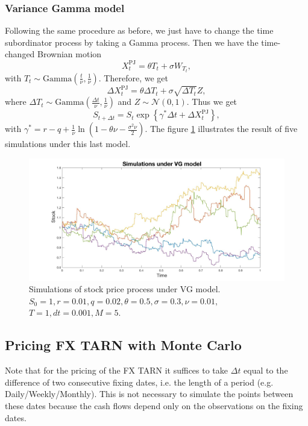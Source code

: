\subsubsection{Variance Gamma model}
Following the same procedure as before, we just have to change the time subordinator process by taking a Gamma process. Then we have the time-changed Brownian motion
$$X_t^\text{PJ}=\theta T_t + \sigma W_{T_t},$$
with $T_t\sim \text{Gamma}\left(\frac{t}{\nu},\frac{1}{\nu} \right)$. Therefore, we get
$$\Delta X_t^\text{PJ} = \theta \Delta T_t + \sigma \sqrt{\Delta T_t} Z,$$
where $\Delta T_t\sim\text{Gamma}\left(\frac{\Delta t}{\nu},\frac{1}{\nu}\right)$ and $Z\sim\mathcal{N}(0,1)$.
Thus we get
$$S_{t+\Delta t} = S_t \exp\left\{\gamma^\ast\Delta t + \Delta X_t^\text{PJ}\right\},$$
with $\gamma^\ast = r-q + \frac{1}{\nu}\ln\left(1-\theta\nu-\frac{\sigma^2\nu}{2}\right)$.
The figure \ref{fig:MC:VG} illustrates the result of five simulations under this last model.
\begin{figure}[!htb]
	\includegraphics[width=\textwidth]{gfx/VG_plot}
	\caption{Simulations of stock price process under VG model.\\ $S_0=1, r= 0.01,q = 0.02,\theta = 0.5 , \sigma = 0.3, \nu = 0.01,$\\$T = 1, dt = 0.001, M=5$.}
	\label{fig:MC:VG}
\end{figure}

\subsection{Pricing FX TARN with Monte Carlo}
Note that for the pricing of the FX TARN it suffices to take $\Delta t$ equal to the difference of two consecutive fixing dates, i.e. the length of a period (e.g. Daily/Weekly/Monthly). This is not necessary to simulate the points between these dates because the cash flows depend only on the observations on the fixing dates.

